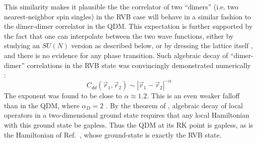 \documentclass[11pt]{iopart}
\begin{document}
This similarity makes it plausible the the correlator of two ``dimers'' (i.e. two nearest-neighbor spin singles) in the RVB case will behave in a similar fashion to the dimer-dimer correlator in the QDM. This expectation is further supported by the fact that one can interpolate between the two wave functions, either by studying an $SU(N)$ version as described below, or by dressing the lattice itself \cite{RMS}, and there is no evidence for any phase transition. Such algebraic decay of   ``dimer-dimer'' correlations  in the RVB state was convincingly demonstrated numerically
\cite{RVB1,RVB2}:
 \begin{equation}
  C_{dd}(\vec{r}_1,\vec{r}_2) \sim \left|\vec{r}_1-\vec{r}_2\right|^{-\alpha}
 \end{equation}
The exponent was found to be close to $\alpha \approx 1.2$. This is an even weaker falloff than in the QDM, where $\alpha_D=2$ \cite{FisherStephenson}. By the theorem of \cite{Hastings_thm}, algebraic decay of local operators in a two-dimensional ground state requires that any local Hamiltonian with this ground state be gapless. Thus the QDM at its RK point is gapless, as is the Hamiltonian of Ref.~\cite{Cano}, whose ground-state is exactly the RVB state. 

\end{document}
